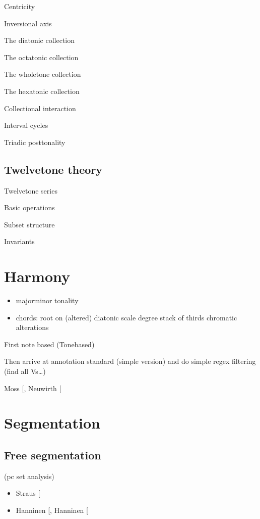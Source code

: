 \documentclass[letterpaper,10pt,english]{sphinxmanual}
\begin{document}
Centricity

Inversional axis

The diatonic collection

The octatonic collection

The whole\sphinxhyphen{}tone collection

The hexatonic collection

Collectional interaction

Interval cycles

Triadic post\sphinxhyphen{}tonality


\section{Twelve\sphinxhyphen{}tone theory}
\label{\detokenize{3_set_theory:twelve-tone-theory}}
Twelve\sphinxhyphen{}tone series

Basic operations

Subset structure

Invariants


\chapter{Harmony}
\label{\detokenize{4_harmony:harmony}}\label{\detokenize{4_harmony::doc}}\begin{itemize}
\item {} 
major\sphinxhyphen{}minor tonality

\item {} 
chords:
\sphinxhyphen{} root on (altered) diatonic scale degree
\sphinxhyphen{} stack of thirds
\sphinxhyphen{} chromatic alterations

\end{itemize}

First note based (Tone\sphinxhyphen{}based)

Then arrive at annotation standard (simple version)
and do simple regex filtering (find all Vs…)

Moss  {[}\sphinxcite{8_bibliography:id20}{]}, Neuwirth  {[}\sphinxcite{8_bibliography:id30}{]}


\chapter{Segmentation}
\label{\detokenize{5_segmentation:segmentation}}\label{\detokenize{5_segmentation::doc}}

\section{Free segmentation}
\label{\detokenize{5_segmentation:free-segmentation}}
(pc set analysis)
\begin{itemize}
\item {} 
Straus {[}\sphinxcite{8_bibliography:id3}{]}

\item {} 
Hanninen {[}\sphinxcite{8_bibliography:id18}{]}, Hanninen {[}\sphinxcite{8_bibliography:id19}{]}

\end{itemize}
\end{document}
